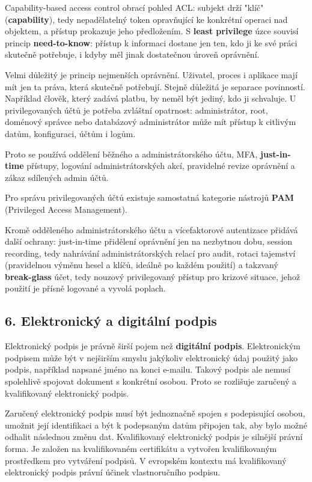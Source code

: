 Capability-based access control obrací pohled ACL: subjekt drží "klíč" (\textbf{capability}), tedy nepadělatelný token opravňující ke konkrétní operaci nad objektem, a přístup prokazuje jeho předložením. S \textbf{least privilege} úzce souvisí princip \textbf{need-to-know}: přístup k informaci dostane jen ten, kdo ji ke své práci skutečně potřebuje, i kdyby měl jinak dostatečnou úroveň oprávnění.

Velmi důležitý je princip nejmenších oprávnění. Uživatel, proces i aplikace mají mít jen ta práva, která skutečně potřebují. Stejně důležitá je separace povinností. Například člověk, který zadává platbu, by neměl být jediný, kdo ji schvaluje. U privilegovaných účtů je potřeba zvláštní opatrnost: administrátor, root, doménový správce nebo databázový administrátor může mít přístup k citlivým datům, konfiguraci, účtům i logům.

Proto se používá oddělení běžného a administrátorského účtu, MFA, \textbf{just-in-time} přístupy, logování administrátorských akcí, pravidelné revize oprávnění a zákaz sdílených admin účtů.

Pro správu privilegovaných účtů existuje samostatná kategorie nástrojů \textbf{PAM} (Privileged Access Management).

Kromě odděleného administrátorského účtu a vícefaktorové autentizace přidává další ochrany: just-in-time přidělení oprávnění jen na nezbytnou dobu, session recording, tedy nahrávání administrátorských relací pro audit, rotaci tajemství (pravidelnou výměnu hesel a klíčů, ideálně po každém použití) a takzvaný \textbf{break-glass} účet, tedy nouzový privilegovaný přístup pro krizové situace, jehož použití je přísně logované a vyvolá poplach.

\subsection*{6. Elektronický a digitální podpis}

Elektronický podpis je právně širší pojem než \textbf{digitální podpis}. Elektronickým podpisem může být v nejširším smyslu jakýkoliv elektronický údaj použitý jako podpis, například napsané jméno na konci e-mailu. Takový podpis ale nemusí spolehlivě spojovat dokument s konkrétní osobou. Proto se rozlišuje zaručený a kvalifikovaný elektronický podpis.

Zaručený elektronický podpis musí být jednoznačně spojen s podepisující osobou, umožnit její identifikaci a být k podepsaným datům připojen tak, aby bylo možné odhalit následnou změnu dat. Kvalifikovaný elektronický podpis je silnější právní forma. Je založen na kvalifikovaném certifikátu a vytvořen kvalifikovaným prostředkem pro vytváření podpisů. V evropském kontextu má kvalifikovaný elektronický podpis právní účinek vlastnoručního podpisu.

